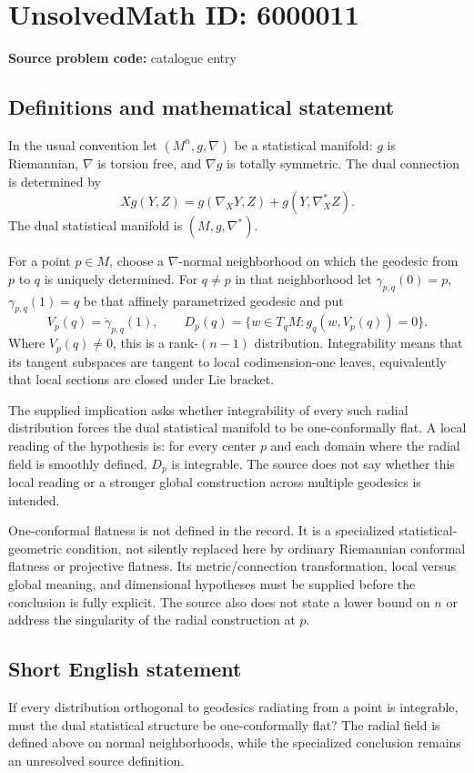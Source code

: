 \documentclass[11pt]{article}
\begin{document}
\section*{UnsolvedMath ID: 6000011}
\textbf{Source problem code:} catalogue entry
\subsection{Definitions and mathematical statement}
In the usual convention let $(M^n,g,\nabla)$ be a statistical manifold: $g$ is Riemannian, $\nabla$ is torsion free, and $\nabla g$ is totally symmetric. The dual connection is determined by
\[
 Xg(Y,Z)=g(\nabla_XY,Z)+g(Y,\nabla_X^*Z).
\]
The dual statistical manifold is $(M,g,\nabla^*)$.

For a point $p\in M$, choose a $\nabla$-normal neighborhood on which the geodesic from $p$ to $q$ is uniquely determined. For $q\ne p$ in that neighborhood let $\gamma_{p,q}(0)=p$, $\gamma_{p,q}(1)=q$ be that affinely parametrized geodesic and put
\[
 V_p(q)=\dot\gamma_{p,q}(1),\qquad
 D_p(q)=\{w\in T_qM:g_q(w,V_p(q))=0\}.
\]
Where $V_p(q)\ne0$, this is a rank-$(n-1)$ distribution. Integrability means that its tangent subspaces are tangent to local codimension-one leaves, equivalently that local sections are closed under Lie bracket.

The supplied implication asks whether integrability of every such radial distribution forces the dual statistical manifold to be one-conformally flat. A local reading of the hypothesis is: for every center $p$ and each domain where the radial field is smoothly defined, $D_p$ is integrable. The source does not say whether this local reading or a stronger global construction across multiple geodesics is intended.

One-conformal flatness is not defined in the record. It is a specialized statistical-geometric condition, not silently replaced here by ordinary Riemannian conformal flatness or projective flatness. Its metric/connection transformation, local versus global meaning, and dimensional hypotheses must be supplied before the conclusion is fully explicit. The source also does not state a lower bound on $n$ or address the singularity of the radial construction at $p$.
\subsection{Short English statement}
If every distribution orthogonal to geodesics radiating from a point is integrable, must the dual statistical structure be one-conformally flat? The radial field is defined above on normal neighborhoods, while the specialized conclusion remains an unresolved source definition.
\end{document}
